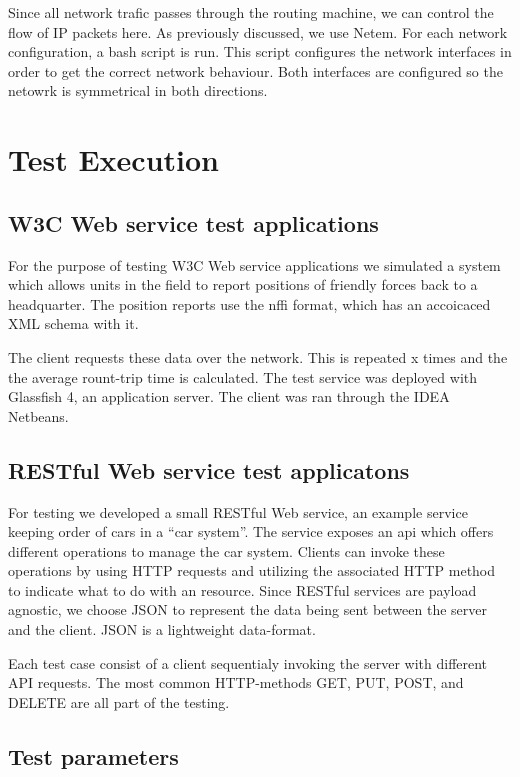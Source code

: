 Since all network trafic passes through the routing machine, we can control
the flow of IP packets here. As previously discussed, we use Netem.  For each
network configuration, a bash script is run. This script configures the
network interfaces in order to get the correct network behaviour. Both
interfaces are configured so the netowrk is symmetrical in both directions. 

\section{Test Execution}

\subsection{W3C Web service test applications}

For the purpose of testing W3C Web service applications we simulated a system
which allows units in the field to report positions of friendly forces back to
a headquarter. The position reports use the \gls{nffi} format, which has an
accoicaced XML schema with it. 

The client requests these data over the network. This is repeated x times and
the the average rount-trip time is calculated. The test service was deployed
with Glassfish 4, an application server. The client was ran through the IDEA
Netbeans.


\subsection{RESTful Web service test applicatons}

For testing we developed a small RESTful Web service, an example service
keeping order of cars in a ``car system''. The service exposes an \gls{api}
which offers different operations to manage the car system. Clients can invoke
these operations by using HTTP requests and utilizing the associated HTTP
method to indicate what to do with an resource. Since RESTful services are
payload agnostic, we choose JSON to represent the data being sent between the
server and the client. JSON is a lightweight data-format.

Each test case consist of a client sequentialy invoking the server with
different API requests. The most common HTTP-methods GET, PUT, POST, and
DELETE are all part of the testing.



\subsection{Test parameters}

